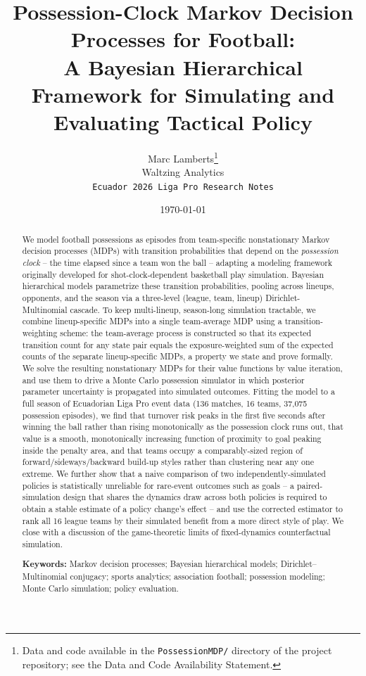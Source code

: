 \documentclass[11pt]{article}
\title{\bfseries Possession-Clock Markov Decision Processes for Football:\\
A Bayesian Hierarchical Framework for Simulating and\\ Evaluating Tactical Policy}
\author{
Marc Lamberts\thanks{Data and code available in the \texttt{PossessionMDP/} directory of the project repository; see the Data and Code Availability Statement.}\\
\small Waltzing Analytics\\
\small \texttt{Ecuador 2026 Liga Pro Research Notes}
}
\date{\today}
\theoremstyle{plain}
\theoremstyle{definition}
\theoremstyle{remark}
\begin{document}
\pagestyle{empty}
\maketitle

\begin{abstract}
\noindent
We model football possessions as episodes from team-specific nonstationary Markov decision processes (MDPs) with transition probabilities that depend on the \emph{possession clock} -- the time elapsed since a team won the ball -- adapting a modeling framework originally developed for shot-clock-dependent basketball play simulation. Bayesian hierarchical models parametrize these transition probabilities, pooling across lineups, opponents, and the season via a three-level (league, team, lineup) Dirichlet-Multinomial cascade. To keep multi-lineup, season-long simulation tractable, we combine lineup-specific MDPs into a single team-average MDP using a transition-weighting scheme: the team-average process is constructed so that its expected transition count for any state pair equals the exposure-weighted sum of the expected counts of the separate lineup-specific MDPs, a property we state and prove formally. We solve the resulting nonstationary MDPs for their value functions by value iteration, and use them to drive a Monte Carlo possession simulator in which posterior parameter uncertainty is propagated into simulated outcomes. Fitting the model to a full season of Ecuadorian Liga Pro event data (136 matches, 16 teams, 37{,}075 possession episodes), we find that turnover risk peaks in the first five seconds after winning the ball rather than rising monotonically as the possession clock runs out, that value is a smooth, monotonically increasing function of proximity to goal peaking inside the penalty area, and that teams occupy a comparably-sized region of forward/sideways/backward build-up styles rather than clustering near any one extreme. We further show that a naive comparison of two independently-simulated policies is statistically unreliable for rare-event outcomes such as goals -- a paired-simulation design that shares the dynamics draw across both policies is required to obtain a stable estimate of a policy change's effect -- and use the corrected estimator to rank all 16 league teams by their simulated benefit from a more direct style of play. We close with a discussion of the game-theoretic limits of fixed-dynamics counterfactual simulation.

\vspace{0.8em}
\noindent\textbf{Keywords:} Markov decision processes; Bayesian hierarchical models; Dirichlet--Multinomial conjugacy; sports analytics; association football; possession modeling; Monte Carlo simulation; policy evaluation.
\end{abstract}
\end{document}
